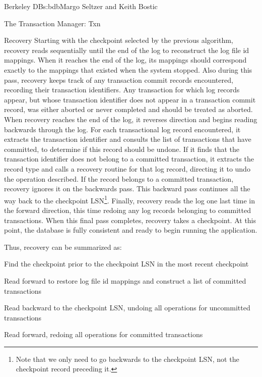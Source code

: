\begin{aosachapter}{Berkeley DB}{s:bdb}{Margo Seltzer and Keith Bostic}
\begin{aosasect1}{The Transaction Manager: Txn}
\begin{aosasect2}{Recovery}
Starting with the checkpoint selected by the previous algorithm,
recovery reads sequentially until the end of the log to reconstruct
the log file id mappings. When it reaches the end of the log, its
mappings should correspond exactly to the mappings that existed when
the system stopped.  Also during this pass, recovery keeps track of
any transaction commit records encountered, recording their 
transaction identifiers. Any transaction for which log records appear, but
whose transaction identifier does not appear in a transaction commit record,
was either aborted or never completed and should be treated as
aborted. When recovery reaches the end of the log, it reverses
direction and begins reading backwards through the log.  For each
transactional log record encountered, it extracts the transaction identifier
and consults the list of transactions that have committed, to
determine if this record should be undone. If it finds that the transaction
identifier does not belong to a committed transaction, it extracts the record
type and calls a recovery routine for that log record, directing it to
undo the operation described. If the record belongs to a committed
transaction, recovery ignores it on the backwards pass. This backward
pass continues all the way back to the checkpoint LSN\footnote{Note that we only
need to go backwards to the checkpoint LSN, not the checkpoint record
preceding it.}. Finally, recovery reads the log one last time in the
forward direction, this time redoing any log records belonging to
committed transactions. When this final pass completes, recovery takes
a checkpoint. At this point, the database is fully consistent and
ready to begin running the application.

Thus, recovery can be summarized as:

\vspace{-0.2cm}

\begin{aosaenumerate}

  \item Find the checkpoint prior to the checkpoint LSN in the most
  recent checkpoint

  \item Read forward to restore log file id mappings and construct a
  list of committed transactions

  \item Read backward to the checkpoint LSN, undoing all operations for
  uncommitted transactions

  \item Read forward, redoing all operations for committed transactions


\end{aosaenumerate}
\end{aosasect2}
\end{aosasect1}
\end{aosachapter}
